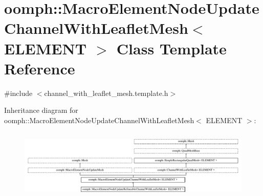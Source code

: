 \hypertarget{classoomph_1_1MacroElementNodeUpdateChannelWithLeafletMesh}{}\section{oomph\+:\+:Macro\+Element\+Node\+Update\+Channel\+With\+Leaflet\+Mesh$<$ E\+L\+E\+M\+E\+NT $>$ Class Template Reference}
\label{classoomph_1_1MacroElementNodeUpdateChannelWithLeafletMesh}


{\ttfamily \#include $<$channel\+\_\+with\+\_\+leaflet\+\_\+mesh.\+template.\+h$>$}

Inheritance diagram for oomph\+:\+:Macro\+Element\+Node\+Update\+Channel\+With\+Leaflet\+Mesh$<$ E\+L\+E\+M\+E\+NT $>$\+:\begin{figure}[H]
\begin{center}
\leavevmode
\includegraphics[height=3.393939cm]{classoomph_1_1MacroElementNodeUpdateChannelWithLeafletMesh}
\end{center}
\end{figure}
